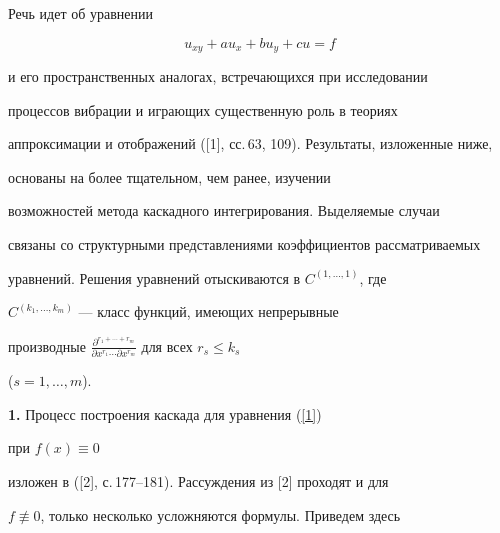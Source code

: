 \pagestyle{plain} %







\maketitle


\label{begin}











Речь идет об уравнении


\begin{equation}\label{1}


u_{xy}+au_{x}+bu_{y}+cu=f


\end{equation}


и его пространственных аналогах, встречающихся при исследовании


процессов вибрации и играющих существенную роль в теориях


аппроксимации и отображений ([1], сс.\,63, 109). Результаты, изложенные ниже,


основаны на более тщательном, чем ранее, изучении


возможностей метода каскадного интегрирования. Выделяемые случаи


связаны со структурными представлениями коэффициентов рассматриваемых


уравнений. Решения уравнений отыскиваются в $C^{(1,\dotsc,1)}$, где


$C^{(k_1,\dotsc,k_m)}$ --- класс функций, имеющих непрерывные


производные $\frac{\partial^{r_1+\dotsb +r_m}}{\partial


x^{r_1}\dotsb \partial x^{r_m}}$ для всех $r_{s}\leqslant k_{s}$


($s=1,\dotsc,m$).


\medskip





{\bf 1.} Процесс построения каскада для  уравнения (\ref{1})


при $f (x) \equiv 0$


изложен в ([2], с.\,177--181). Рассуждения из [2] проходят и для


$f\not\equiv 0$, только несколько усложняются формулы. Приведем здесь


